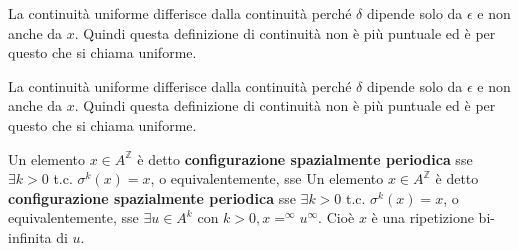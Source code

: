\begin{nota}
    La continuità uniforme differisce dalla continuità perché $\delta$ dipende 
    solo da $\epsilon$ e non anche da $x$. Quindi questa definizione di continuità non 
    è più puntuale ed è per questo che si chiama uniforme.
\end{nota}

\begin{nota}
    La continuità uniforme differisce dalla continuità perché $\delta$ dipende 
    solo da $\epsilon$ e non anche da $x$. Quindi questa definizione di continuità non 
    è più puntuale ed è per questo che si chiama uniforme.
\end{nota}

\begin{definizione}
    Un elemento $x\in A^\mathbb{Z}$ è detto \textbf{configurazione spazialmente
        periodica} sse $\exists k>0 $ t.c. $\sigma^k(x) = x$, o equivalentemente, sse
    Un elemento $x\in A^\mathbb{Z}$ è detto \textbf{configurazione spazialmente
        periodica} sse $\exists k>0 $ t.c. $\sigma^k(x) = x$, o equivalentemente, sse
    $\exists u\in A^k$ con $k>0, x = ^\infty u ^\infty$. Cioè $x$ è una ripetizione
    bi-infinita di $u$.
\end{definizione}

